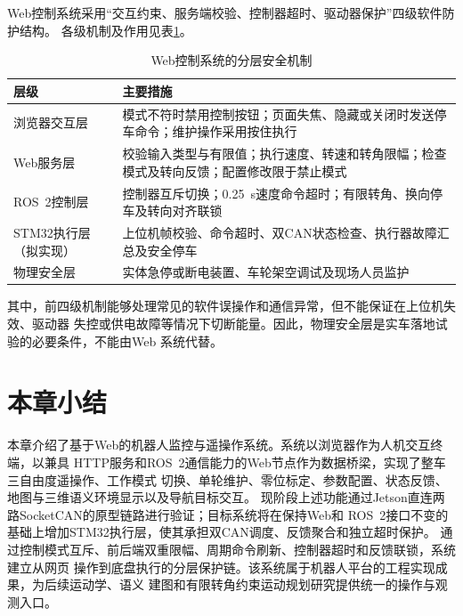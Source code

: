 Web控制系统采用“交互约束、服务端校验、控制器超时、驱动器保护”四级软件防护结构。
各级机制及作用见表\ref{tab:web-safety}。

\begin{table}[htbp]
    \centering
    \caption{Web控制系统的分层安全机制}
    \label{tab:web-safety}
    \begin{tabularx}{\textwidth}{p{3.0cm}X}
        \toprule
        层级 & 主要措施 \\
        \midrule
        浏览器交互层 & 模式不符时禁用控制按钮；页面失焦、隐藏或关闭时发送停车命令；维护操作采用按住执行 \\
        Web服务层 & 校验输入类型与有限值；执行速度、转速和转角限幅；检查模式及转向反馈；配置修改限于禁止模式 \\
        ROS~2控制层 & 控制器互斥切换；0.25~s速度命令超时；有限转角、换向停车及转向对齐联锁 \\
        STM32执行层（拟实现） & 上位机帧校验、命令超时、双CAN状态检查、执行器故障汇总及安全停车 \\
        物理安全层 & 实体急停或断电装置、车轮架空调试及现场人员监护 \\
        \bottomrule
    \end{tabularx}
\end{table}

其中，前四级机制能够处理常见的软件误操作和通信异常，但不能保证在上位机失效、驱动器
失控或供电故障等情况下切断能量。因此，物理安全层是实车落地试验的必要条件，不能由Web
系统代替。

\section{本章小结}

本章介绍了基于Web的机器人监控与遥操作系统。系统以浏览器作为人机交互终端，以兼具
HTTP服务和ROS~2通信能力的Web节点作为数据桥梁，实现了整车三自由度遥操作、工作模式
切换、单轮维护、零位标定、参数配置、状态反馈、地图与三维语义环境显示以及导航目标交互。
现阶段上述功能通过Jetson直连两路SocketCAN的原型链路进行验证；目标系统将在保持Web和
ROS~2接口不变的基础上增加STM32执行层，使其承担双CAN调度、反馈聚合和独立超时保护。
通过控制模式互斥、前后端双重限幅、周期命令刷新、控制器超时和反馈联锁，系统建立从网页
操作到底盘执行的分层保护链。该系统属于机器人平台的工程实现成果，为后续运动学、语义
建图和有限转角约束运动规划研究提供统一的操作与观测入口。
